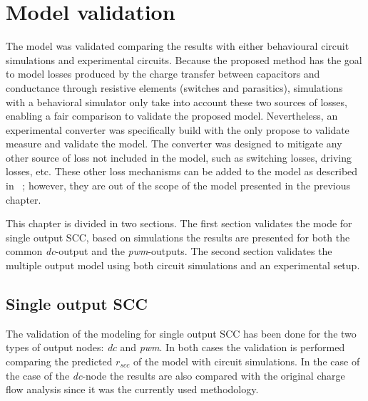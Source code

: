 \chapter{Model validation}
The model was validated comparing the results with either behavioural circuit simulations and experimental circuits.  Because the proposed method has the goal to model losses produced by the charge transfer between capacitors and conductance through resistive elements (switches and parasitics), simulations with a behavioral simulator only take into account these two sources of losses, enabling a fair comparison to validate the proposed model.  Nevertheless, an experimental converter was specifically build with the only propose to validate measure and validate the model. The converter was designed to mitigate any other source of loss not included in the model, such as switching losses, driving losses, etc. These other loss mechanisms can be added to the model as described in ~\cite{Seeman:EECS-2009-78}; however, they are out of the scope of the model presented in the previous chapter.

This chapter is divided in two sections. The first section validates the mode for single output SCC, based on simulations the results are presented for both the common \emph{dc}-output and the \emph{pwm}-outputs.  The second section validates the multiple output model using both circuit simulations and an experimental setup.

\section{Single output SCC}
The validation of the modeling for single output SCC has been done for the two types of output nodes: \emph{dc} and \emph{pwm}. In both cases the validation is performed comparing the predicted $r_{scc}$ of the model with circuit simulations. In the case of the case of the \emph{dc}-node the results are also compared with the original charge flow analysis since it was the currently used methodology.

